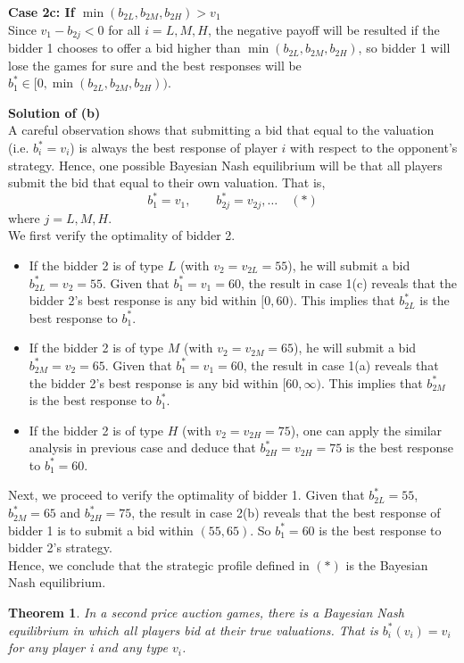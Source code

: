 \documentclass[twoside]{article}
\theoremstyle{definitionstyle}
\newtheorem*{theorem}{Theorem}
\begin{document}
\vspace{0.5em}
\noindent \textbf{Case 2c: If $\min(b_{2L}, b_{2M}, b_{2H}) > v_1$} \\
Since $v_1 - b_{2j} < 0$ for all $i = L, M, H$, the negative payoff will be resulted if the bidder 1 chooses to offer a bid higher than $\min(b_{2L}, b_{2M}, b_{2H})$, so bidder 1 will lose the games for sure and the best responses will be $b_1^* \in [0, \min(b_{2L}, b_{2M}, b_{2H}))$.

\vspace{1em}
\noindent \textbf{Solution of (b)} \\
A careful observation shows that submitting a bid that equal to the valuation (i.e. $b_i^* = v_i$) is always the best response of player $i$ with respect to the opponent’s strategy. Hence, one possible Bayesian Nash equilibrium will be that all players submit the bid that equal to their own valuation. That is, 
\[
b_1^* = v_1, \qquad b_{2j}^* = v_{2j}, \dots \quad (*)
\]
where $j = L, M, H$. \\
We first verify the optimality of bidder 2. 
\begin{itemize}
    \item If the bidder 2 is of type $L$ (with $v_2 = v_{2L} = 55$), he will submit a bid $b_{2L}^* = v_2 = 55$. Given that $b_1^* = v_1 = 60$, the result in case 1(c) reveals that the bidder 2’s best response is any bid within $[0,60)$. This implies that $b_{2L}^*$ is the best response to $b_1^*$. 
    \item If the bidder 2 is of type $M$ (with $v_2 = v_{2M} = 65$), he will submit a bid $b_{2M}^* = v_2 = 65$. Given that $b_1^* = v_1 = 60$, the result in case 1(a) reveals that the bidder 2’s best response is any bid within $[60, \infty)$. This implies that $b_{2M}^*$ is the best response to $b_1^*$. 
    \item If the bidder 2 is of type $H$ (with $v_2 = v_{2H} = 75$), one can apply the similar analysis in previous case and deduce that $b_{2H}^* = v_{2H} = 75$ is the best response to $b_1^* = 60$. 
\end{itemize}
Next, we proceed to verify the optimality of bidder 1. Given that $b_{2L}^* = 55$, $b_{2M}^* = 65$ and $b_{2H}^* = 75$, the result in case 2(b) reveals that the best response of bidder 1 is to submit a bid within $(55,65)$. So $b_1^* = 60$ is the best response to bidder 2’s strategy. \\
Hence, we conclude that the strategic profile defined in $(*)$ is the Bayesian Nash equilibrium.
\begin{theorem}
    In a second price auction games, there is a Bayesian Nash equilibrium in 
which all players bid at their true valuations. That is $b_i^*(v_i) = v_i$ for any player i and any type $v_i$. 
\end{theorem}
\end{document}
